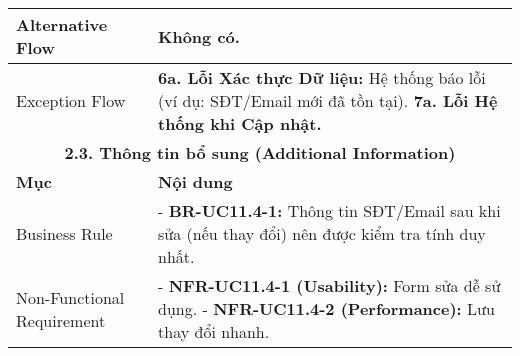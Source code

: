 \begin{longtable}{|m{4cm}|p{11cm}|}
\hline
Alternative Flow & Không có. \\
\hline
Exception Flow & \textbf{6a. Lỗi Xác thực Dữ liệu:} Hệ thống báo lỗi (ví dụ: SĐT/Email mới đã tồn tại). \newline \textbf{7a. Lỗi Hệ thống khi Cập nhật.} \\
\hline
\multicolumn{2}{|c|}{\textbf{2.3. Thông tin bổ sung (Additional Information)}} \\
\hline
\textbf{Mục} & \textbf{Nội dung} \\
\hline
Business Rule & - \textbf{BR-UC11.4-1:} Thông tin SĐT/Email sau khi sửa (nếu thay đổi) nên được kiểm tra tính duy nhất. \\
\hline
Non-Functional Requirement & - \textbf{NFR-UC11.4-1 (Usability):} Form sửa dễ sử dụng. \newline - \textbf{NFR-UC11.4-2 (Performance):} Lưu thay đổi nhanh. \\
\hline
\end{longtable}

